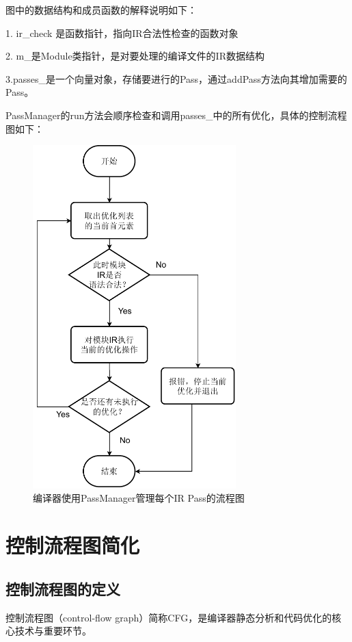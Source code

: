 图中的数据结构和成员函数的解释说明如下：

1. ir\_check 是函数指针，指向IR合法性检查的函数对象

2. m\_是Module类指针，是对要处理的编译文件的IR数据结构

3.passes\_是一个向量对象，存储要进行的Pass，通过addPass方法向其增加需要的Pass。

PassManager的run方法会顺序检查和调用passes\_中的所有优化，具体的控制流程图如下：
 
\begin{figure}[htb]
  \centering
  \includegraphics[width=0.7\textwidth]{figures/passManagerRunMethod.pdf}
  \caption{编译器使用PassManager管理每个IR Pass的流程图}
  \label{fig:passMnagerRun}
\end{figure}

\section{控制流程图简化}
\subsection{控制流程图的定义}
控制流程图（control-flow graph）简称CFG，是编译器静态分析和代码优化的核心技术与重要环节。

